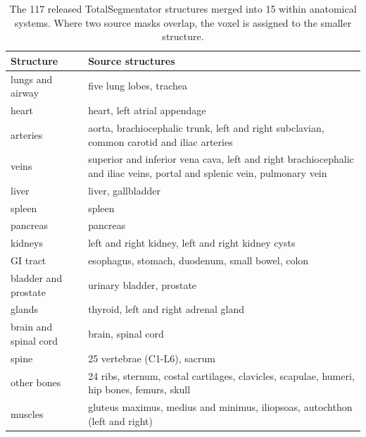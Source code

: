 \begin{table}[H]
\centering
\caption{Selection and held-out cases and positives per classification label, identical in every run. FDG-PET/CT (held-out) and RSNA22 C-spine (selection) each list one case fewer than Tab.~\ref{tab:cohorts}, whose image was missing from our copy of the data. Except for AMOS, whose release gives no patient identifiers, no patient appears in two splits: FDG-PET/CT and RSNA19 ICH are split by patient, COVID-CTset, LUNA25 and RSNA23 trauma contain one scan per patient, and RSNA22 C-spine one study per patient \citep{lin2023rsnacsfdata}.}
\label{tab:labelcounts}
\end{table}

\begin{table}[H]
\centering
\caption{The 117 released TotalSegmentator structures merged into 15 within anatomical systems. Where two source masks overlap, the voxel is assigned to the smaller structure.}
\label{tab:totalseg}
\small
\begin{tabular}{@{}lp{}@{}}
\toprule
Structure & Source structures \\
\midrule
lungs and airway & five lung lobes, trachea \\
heart & heart, left atrial appendage \\
arteries & aorta, brachiocephalic trunk, left and right subclavian, common carotid and iliac arteries \\
veins & superior and inferior vena cava, left and right brachiocephalic and iliac veins, portal and splenic vein, pulmonary vein \\
liver & liver, gallbladder \\
spleen & spleen \\
pancreas & pancreas \\
kidneys & left and right kidney, left and right kidney cysts \\
GI tract & esophagus, stomach, duodenum, small bowel, colon \\
bladder and prostate & urinary bladder, prostate \\
glands & thyroid, left and right adrenal gland \\
brain and spinal cord & brain, spinal cord \\
spine & 25 vertebrae (C1-L6), sacrum \\
other bones & 24 ribs, sternum, costal cartilages, clavicles, scapulae, humeri, hip bones, femurs, skull \\
muscles & gluteus maximus, medius and minimus, iliopsoas, autochthon (left and right) \\
\bottomrule
\end{tabular}
\end{table}

